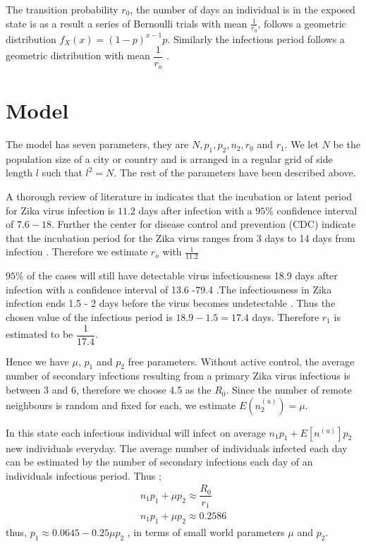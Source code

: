 The transition probability $r_0$, the number of days an individual is in the exposed state is as a result a series of Bernoulli trials with mean $\frac{1}{r_0}$, follows a geometric distribution $f_X (x) = (1-p) ^ {x-1} p$. Similarly the infectious period follows a geometric distribution with mean $\dfrac{1}{r_o}$ \citep{fu2013propagation}.

\section{Model}
The model has seven parameters, they are $N, p_1, p_2, n_2, r_0$ and $r_1$. We let $N$ be the population size of a city or country and is arranged in a regular grid of side length $l $ such that $l^2 = N$. The rest of the parameters have been described above.

A thorough review of literature in \cite{lessler2016times} indicates that the incubation or latent period for Zika virus infection is $11.2$ days after infection with a $95 \%$ confidence interval of $7.6 -18$. Further the center for disease control and prevention (CDC) indicate that the incubation period for the Zika virus ranges from 3 days to 14 days from infection \citep{krow2017estimated}. Therefore we estimate $r_o$ with $\frac{1}{11.2}$

  $95\%$ of the cases will still have detectable virus infectiousness 18.9 days after infection with a confidence interval of 13.6 -79.4 \citep{lessler2016times}.The infectiousness in Zika infection ends 1.5 - 2 days before the virus becomes undetectable \citep{funk2016comparative}. Thus the chosen value of the infectious period is $18.9 - 1.5 = 17.4$ days. Therefore $r_1$ is estimated to be $\dfrac{1}{17.4}$.

Hence we have $\mu$, $p_1$ and $p_2$ free parameters. Without active control, the average number of secondary infections resulting from a primary  Zika  virus infectious is between 3 and 6, therefore we choose 4.5 as the $R_0$. Since the number of remote neighbours is random and fixed for each, we estimate $E (n^ {(u)} _2) = \mu$.

In this state each infectious individual will infect on average $n_1p_1 + E[n^(u)]p_2 $ new individuals everyday. The average number  of individuals infected each day can be estimated by the number of secondary infections each day of an individuals infectious period. Thus ;
\begin{align}
n_1 p_1 + \mu p_2 \approx \dfrac{R_0}{r_1} 
\\ n_1 p_1 + \mu p_2 \approx 0.2586 \label{eqn 5.32}
\end{align}
thus, 
$p_1 \approx   0.0645- 0.25 \mu p_2$ , in terms of small world parameters $\mu$ and $p_2$.

